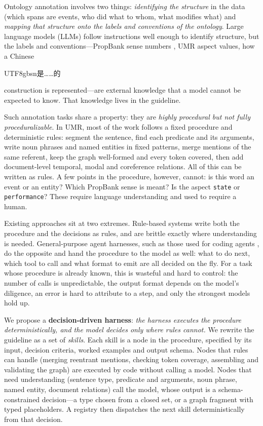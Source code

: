 \documentclass[11pt]{article}
\newcommand{\umr}{\textsc{UMR}\xspace}
\newcommand{\zh}[1]{\begin{CJK}{UTF8}{gbsn}#1\end{CJK}}
\begin{document}
Ontology annotation involves two things: \emph{identifying the structure} in the data (which spans are events, who did what to whom, what modifies what) and \emph{mapping that structure onto the labels and conventions of the ontology}. Large language models (LLMs) follow instructions well enough to identify structure, but the labels and conventions---PropBank sense numbers \citep{palmer2005propbank}, \umr aspect values, how a Chinese \zh{是……的} construction is represented---are external knowledge that a model cannot be expected to know. That knowledge lives in the guideline.

Such annotation tasks share a property: they are \emph{highly procedural but not fully proceduralizable}. In \umr, most of the work follows a fixed procedure and deterministic rules: segment the sentence, find each predicate and its arguments, write noun phrases and named entities in fixed patterns, merge mentions of the same referent, keep the graph well-formed and every token covered, then add document-level temporal, modal and coreference relations. All of this can be written as rules. A few points in the procedure, however, cannot: is this word an event or an entity? Which PropBank sense is meant? Is the aspect \texttt{state} or \texttt{performance}? These require language understanding and used to require a human.

Existing approaches sit at two extremes. Rule-based systems write both the procedure and the decisions as rules, and are brittle exactly where understanding is needed. General-purpose agent harnesses, such as those used for coding agents \citep{yao2023react}, do the opposite and hand the procedure to the model as well: what to do next, which tool to call and what format to emit are all decided on the fly. For a task whose procedure is already known, this is wasteful and hard to control: the number of calls is unpredictable, the output format depends on the model's diligence, an error is hard to attribute to a step, and only the strongest models hold up.

We propose a \textbf{decision-driven harness}: \emph{the harness executes the procedure deterministically, and the model decides only where rules cannot.} We rewrite the guideline as a set of \emph{skills}. Each skill is a node in the procedure, specified by its input, decision criteria, worked examples and output schema. Nodes that rules can handle (merging reentrant mentions, checking token coverage, assembling and validating the graph) are executed by code without calling a model. Nodes that need understanding (sentence type, predicate and arguments, noun phrase, named entity, document relations) call the model, whose output is a schema-constrained decision---a type chosen from a closed set, or a graph fragment with typed placeholders. A registry then dispatches the next skill deterministically from that decision.
\end{document}
